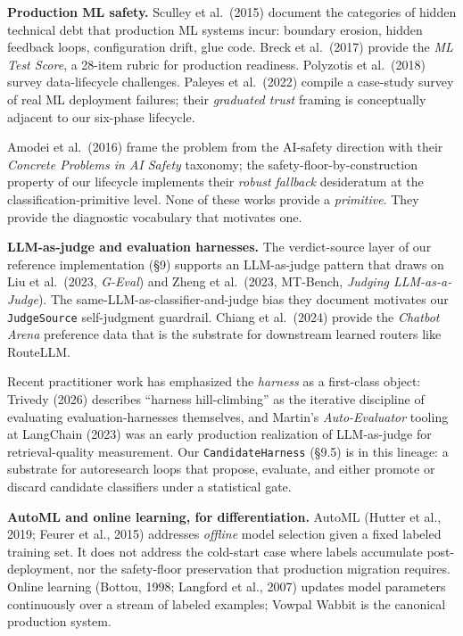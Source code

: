 \textbf{Production ML safety.} Sculley et al.~(2015) document the
categories of hidden technical debt that production ML systems incur:
boundary erosion, hidden feedback loops, configuration drift, glue code.
Breck et al.~(2017) provide the \emph{ML Test Score}, a 28-item rubric
for production readiness. Polyzotis et al.~(2018) survey data-lifecycle
challenges. Paleyes et al.~(2022) compile a case-study survey of real ML
deployment failures; their \emph{graduated trust} framing is
conceptually adjacent to our six-phase lifecycle.

Amodei et al.~(2016) frame the problem from the AI-safety direction with
their \emph{Concrete Problems in AI Safety} taxonomy; the
safety-floor-by-construction property of our lifecycle implements their
\emph{robust fallback} desideratum at the classification-primitive
level. None of these works provide a \emph{primitive}. They provide the
diagnostic vocabulary that motivates one.

\textbf{LLM-as-judge and evaluation harnesses.} The verdict-source layer
of our reference implementation (§9) supports an LLM-as-judge pattern
that draws on Liu et al.~(2023, \emph{G-Eval}) and Zheng et al.~(2023,
MT-Bench, \emph{Judging LLM-as-a-Judge}). The
same-LLM-as-classifier-and-judge bias they document motivates our
\texttt{JudgeSource} self-judgment guardrail. Chiang et al.~(2024)
provide the \emph{Chatbot Arena} preference data that is the substrate
for downstream learned routers like RouteLLM.

Recent practitioner work has emphasized the \emph{harness} as a
first-class object: Trivedy (2026) describes ``harness hill-climbing''
as the iterative discipline of evaluating evaluation-harnesses
themselves, and Martin's \emph{Auto-Evaluator} tooling at LangChain
(2023) was an early production realization of LLM-as-judge for
retrieval-quality measurement. Our \texttt{CandidateHarness} (§9.5) is
in this lineage: a substrate for autoresearch loops that propose,
evaluate, and either promote or discard candidate classifiers under a
statistical gate.

\textbf{AutoML and online learning, for differentiation.} AutoML (Hutter
et al., 2019; Feurer et al., 2015) addresses \emph{offline} model
selection given a fixed labeled training set. It does not address the
cold-start case where labels accumulate post-deployment, nor the
safety-floor preservation that production migration requires. Online
learning (Bottou, 1998; Langford et al., 2007) updates model parameters
continuously over a stream of labeled examples; Vowpal Wabbit is the
canonical production system.

